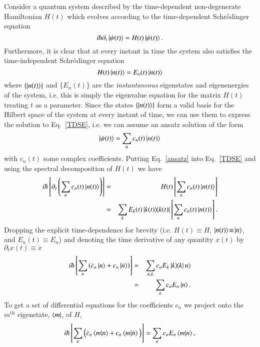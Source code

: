 Consider a quantum system described by the time-dependent non-degenerate Hamiltonian $H(t)$ which evolves according to the time-dependent Schr\"odinger equation
\begin{equation}
\label{TDSE}
i\hbar \partial_t \ket{\psi(t)} = H(t) \ket{\psi(t)}.
\end{equation}
Furthermore, it is clear that at every instant in time the system also satisfies the time-independent Schr\"odinger equation
\begin{equation}
\label{TISE}
H(t) \ket{n(t)} = E_n(t) \ket{n(t)}
\end{equation}
where $\{ \ket{n(t)} \}$ and $\{ E_n(t) \}$ are the {\it instantaneous} eigenstates and eigenenergies of the system, i.e. this is simply the eigenvalue equation for the matrix $H(t)$ treating $t$ as a parameter. Since the states $\{ \ket{n(t)} \}$ form a valid basis for the Hilbert space of the system at every instant of time, we can use them to express the solution to Eq.~\eqref{TDSE}, i.e. we can assume an ansatz solution of the form
\begin{equation}
\label{ansatz}
\ket{\psi(t)} = \sum_n c_n(t) \ket{n(t)}
\end{equation}
with $c_n(t)$ some complex coefficients. Putting Eq.~\eqref{ansatz} into Eq.~\eqref{TDSE} and using the spectral decomposition of $H(t)$ we have 
\begin{eqnarray}
i \hbar \left[ \partial_t \left( \sum_n c_n(t) \ket{n(t)} \right) \right] & = & H(t) \left[  \sum_n c_n(t) \ket{n(t)} \right] \nonumber \\
& = & \sum_k E_k(t) \ketbra{k(t)}{k(t)} \left[  \sum_n c_n(t) \ket{n(t)} \right].
\end{eqnarray}
Dropping the explicit time-dependence for brevity (i.e. $H(t)\!\equiv\! H$, $\ket{n(t)}\!\equiv\! \ket{n}$, and $E_n(t)\!\equiv \! E_n$) and denoting the time derivative of any quantity $x(t)$ by $\partial_t x(t) \equiv \dot{x}$
\begin{eqnarray}
i\hbar \left[ \sum_n \left( \dot{c}_n \ket{n} + c_n \ket{\dot{n}} \right) \right] & = & \sum_{n,k} c_n E_k \ketbra{k}{k} n\rangle \nonumber \\
&=& \sum_n c_n E_n \ket{n}. 
\end{eqnarray}
To get a set of differential equations for the coefficients $c_n$ we project onto the $m^\text{th}$ eigenstate, $\bra{m}$, of $H$, 
\begin{equation}
i\hbar \left[ \sum_n \Big( \dot{c}_n \braket{m}{n} + c_n \braket{m}{\dot{n}} \Big) \right] = \sum_n c_n E_n \braket{m}{n},
\end{equation}
